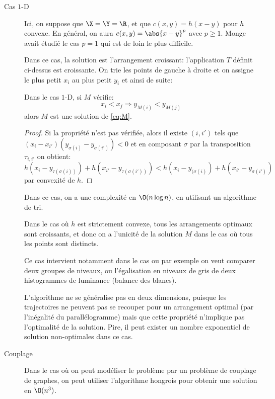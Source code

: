 \documentclass[info, math, french]{mpb-cours}
\begin{document}
\begin{description}
	\item[Cas $1$-D]
	      Ici, on suppose que $\X = \Y = \R$, et que $c(x, y) = h(x - y)$ pour $h$ convexe.
	      En général, on aura $c(x, y) = \abs{x - y}^{p}$ avec $p \geq 1$.
	      Monge avait étudié le cas $p = 1$ qui est de loin le plus difficile.

	      Dans ce cas, la solution est l'arrangement croissant: l'application $T$ définit ci-dessus est croissante.
	      On trie les points de gauche à droite et on assigne le plus petit $x_{i}$ au plus petit $y_{i}$ et ainsi de suite:
	      \begin{thm}
		      Dans le cas $1$-D, si $M$ vérifie:
		      \begin{equation*}
			      x_{i} < x_{j} \Rightarrow y_{M(i)} < y_{M(j)}
		      \end{equation*}
		      alors $M$ est une solution de \eqref{eq:M}.
	      \end{thm}
	      \begin{proof}
		      Si la propriété n'est pas vérifiée, alors il existe $(i, i')$ tels que $(x_{i} - x_{i'})(y_{\sigma(i)} - y_{\sigma(i')}) < 0$ et en composant $\sigma$ par la transposition $\tau_{i, i'}$ on obtient:
		      \begin{equation*}
			      h(x_{i} - y_{\tau(\sigma(i))}) + h(x_{i'} - y_{\tau(\sigma(i'))}) < h(x_{i} - y_{(\sigma(i)}) + h(x_{i'} - y_{\sigma(i')})
		      \end{equation*}
		      par convexité de $h$.
	      \end{proof}
	      \begin{corollaire}
		      Dans ce cas, on a une complexité en $\O(n \log n)$, en utilisant un algorithme de tri.
	      \end{corollaire}
	      \begin{remarque}
		      Dans le cas où $h$ est strictement convexe, tous les arrangements optimaux sont croissants, et donc on a l'unicité de la solution $M$ dans le cas où tous les points sont distincts.
	      \end{remarque}
	      Ce cas intervient notamment dans le cas ou par exemple on veut comparer deux groupes de niveaux,
	      ou l'égalisation en niveaux de gris de deux histogrammes de luminance (balance des blancs).

	      L'algorithme ne se généralise pas en deux dimensions, puisque les trajectoires ne
	      peuvent pas se recouper pour un arrangement optimal (par l'inégalité du parallélogramme)
	      mais que cette propriété n'implique pas l'optimalité de la solution.
	      Pire, il peut exister un nombre exponentiel de solution non-optimales dans ce cas.

	\item[Couplage] Dans le cas où on peut modéliser le problème par un problème de couplage
	      de graphes, on peut utiliser l'algorithme hongrois pour obtenir une solution en $\O(n^{3})$.
\end{description}
\end{document}
